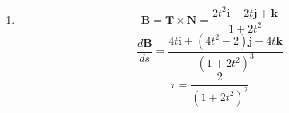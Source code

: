 \documentclass[12pt]{article}
\begin{document}
\begin{enumerate}
\begin{enumerate}[label=(\alph*)]
        \item 
        \[
          \mathbf{B}=\mathbf{T}\times \mathbf{N}
          =\frac{2t^2 \mathbf{i}-2t \mathbf{j}+\mathbf{k}}{1+2t^2}
        \]
        \[
          \frac{d\mathbf{B}}{ds}=\frac{4t\mathbf{i}+(4t^2-2)\mathbf{j}-4t\mathbf{k}}{(1+2t^2)^3}
        \]
        \[
          \tau=\frac{2}{(1+2t^2)^2}
        \]
    \end{enumerate}
\end{enumerate}
\end{document}
